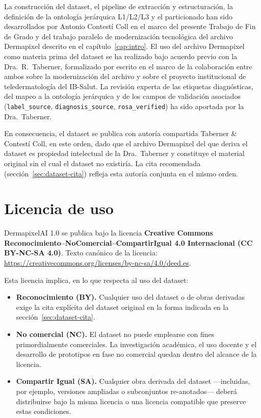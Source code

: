 La construcción del dataset, el pipeline de extracción y
estructuración, la definición de la ontología jerárquica L1/L2/L3 y
el particionado han sido desarrollados por Antonio Contestí Coll en
el marco del presente Trabajo de Fin de Grado y del trabajo
paralelo de modernización tecnológica del archivo Dermapixel
descrito en el capítulo~\ref{cap:intro}. El uso del archivo
Dermapixel como materia prima del dataset se ha realizado bajo
acuerdo previo con la Dra.~R.~Taberner, formalizado por escrito en
el marco de la colaboración entre ambos sobre la modernización del
archivo y sobre el proyecto institucional de teledermatología del
IB-Salut. La revisión experta de las etiquetas diagnósticas, del
mapeo a la ontología jerárquica y de los campos de validación
asociados (\texttt{label\_source}, \texttt{diagnosis\_source},
\texttt{rosa\_verified}) ha sido aportada por la Dra.~Taberner.

En consecuencia, el dataset se publica con autoría compartida
Taberner \& Contestí Coll, en este orden, dado que el archivo
Dermapixel del que deriva el dataset es propiedad intelectual de la
Dra.~Taberner y constituye el material original sin el cual el
dataset no existiría. La cita recomendada
(sección~\ref{sec:dataset-cita}) refleja esta autoría conjunta en
el mismo orden.

\section{Licencia de uso}
\label{sec:dataset-licencia}

DermapixelAI 1.0 se publica bajo la licencia \textbf{Creative
Commons Reconocimiento--NoComercial--CompartirIgual 4.0
Internacional (CC BY-NC-SA 4.0)}. Texto canónico de la licencia:
\url{https://creativecommons.org/licenses/by-nc-sa/4.0/deed.es}.

Esta licencia implica, en lo que respecta al uso del dataset:

\begin{itemize}
\item \textbf{Reconocimiento (BY).} Cualquier uso del dataset o de
obras derivadas exige la cita explícita del dataset original en la
forma indicada en la sección~\ref{sec:dataset-cita}.
\item \textbf{No comercial (NC).} El dataset no puede emplearse con
fines primordialmente comerciales. La investigación académica, el
uso docente y el desarrollo de prototipos en fase no comercial
quedan dentro del alcance de la licencia.
\item \textbf{Compartir Igual (SA).} Cualquier obra derivada del
dataset ---incluidas, por ejemplo, versiones ampliadas o subconjuntos
re-anotados--- deberá distribuirse bajo la misma licencia o una
licencia compatible que preserve estas condiciones.
\end{itemize}

